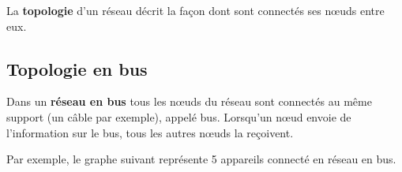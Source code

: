 \documentclass[11pt, a4paper]{book}
\begin{document}
\begin{defi}
La {\bf topologie} d'un réseau décrit la façon dont sont connectés ses nœuds entre eux.
\end{defi}



\subsection{Topologie en bus}

\begin{defi}
Dans un {\bf réseau en bus} tous les nœuds du réseau sont connectés au même support (un câble par exemple), appelé bus. Lorsqu’un nœud envoie de l'information sur le bus, tous les autres nœuds la reçoivent.
\end{defi}

Par exemple, le graphe suivant représente 5 appareils connecté en réseau en bus. 

\begin{center}
\end{center}
\end{document}
